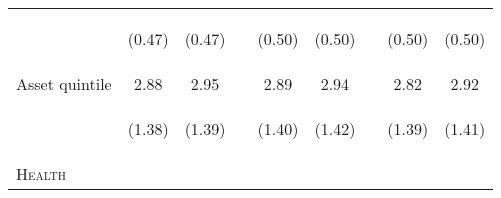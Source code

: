 \documentclass{article}[11pt,subeqn]
\begin{document}
\begin{spacing}{1.5}
\begin{table}[ht]
\begin{center}
\begin{tabular}{lccp{5mm}ccp{5mm}cc}
\begin{footnotesize}\end{footnotesize}	& \begin{footnotesize} (0.47)\end{footnotesize} & \begin{footnotesize} (0.47)\end{footnotesize} & \begin{footnotesize} 	\end{footnotesize} & \begin{footnotesize} (0.50)\end{footnotesize} & \begin{footnotesize} (0.50)\end{footnotesize} & \begin{footnotesize} 	\end{footnotesize} & \begin{footnotesize} (0.50)\end{footnotesize} & \begin{footnotesize} (0.50)\end{footnotesize}	\\
Asset quintile	&	2.88	&	2.95	&	&	2.89	&	2.94	&	&	2.82	&	2.92		\\
\begin{footnotesize}\end{footnotesize}	& \begin{footnotesize} (1.38)\end{footnotesize} & \begin{footnotesize} (1.39)\end{footnotesize} & \begin{footnotesize} 	\end{footnotesize} & \begin{footnotesize} (1.40)\end{footnotesize} & \begin{footnotesize} (1.42)\end{footnotesize} & \begin{footnotesize} 	\end{footnotesize} & \begin{footnotesize} (1.39)\end{footnotesize} & \begin{footnotesize} (1.41)\end{footnotesize}	\\
\textsc{Health} & & &&&&&& \\															

\end{tabular}
\end{center}
\end{table}
\end{spacing}
\end{document}
